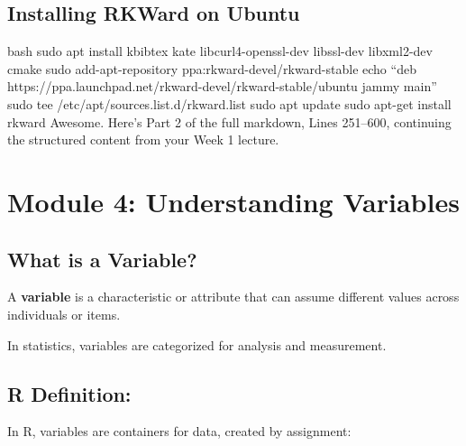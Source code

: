\documentclass[
  letterpaper,
  DIV=11,
  numbers=noendperiod]{scrreprt}
\begin{document}
\subsection{Installing RKWard on
Ubuntu}\label{installing-rkward-on-ubuntu}

bash sudo apt install kbibtex kate libcurl4-openssl-dev libssl-dev
libxml2-dev cmake sudo add-apt-repository ppa:rkward-devel/rkward-stable
echo ``deb https://ppa.launchpad.net/rkward-devel/rkward-stable/ubuntu
jammy main'' \textbar{} sudo tee /etc/apt/sources.list.d/rkward.list
sudo apt update sudo apt-get install rkward Awesome. Here's Part 2 of
the full markdown, Lines 251--600, continuing the structured content
from your Week 1 lecture.

\section{Module 4: Understanding
Variables}\label{module-4-understanding-variables}

\subsection{What is a Variable?}\label{what-is-a-variable}

A \textbf{variable} is a characteristic or attribute that can assume
different values across individuals or items.

In statistics, variables are categorized for analysis and measurement.

\subsection{R Definition:}\label{r-definition}

In R, variables are containers for data, created by assignment:
\end{document}

